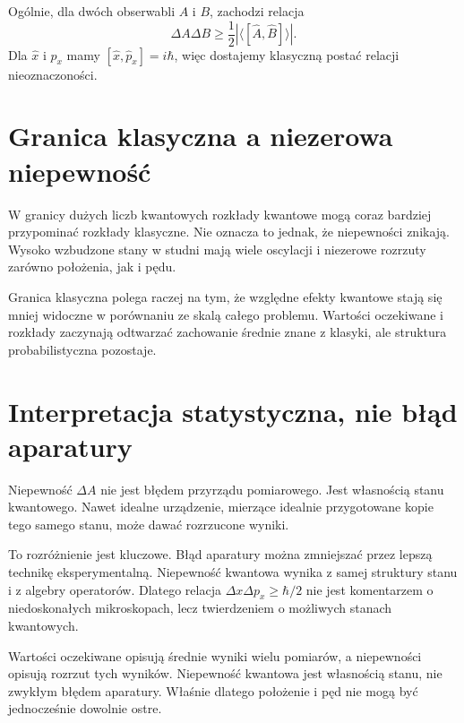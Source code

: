 Ogólnie, dla dwóch obserwabli \(A\) i \(B\), zachodzi relacja
\begin{equation}
    \Delta A\Delta B\geq \frac{1}{2}\left|\langle [\hat{A},\hat{B}]\rangle\right|.
\end{equation}
Dla \(\hat{x}\) i \(\hat{p}_x\) mamy \([\hat{x},\hat{p}_x]=i\hbar\), więc dostajemy klasyczną postać relacji nieoznaczoności.

\section{Granica klasyczna a niezerowa niepewność}

W granicy dużych liczb kwantowych rozkłady kwantowe mogą coraz bardziej przypominać rozkłady klasyczne. Nie oznacza to jednak, że niepewności znikają. Wysoko wzbudzone stany w studni mają wiele oscylacji i niezerowe rozrzuty zarówno położenia, jak i pędu.

Granica klasyczna polega raczej na tym, że względne efekty kwantowe stają się mniej widoczne w porównaniu ze skalą całego problemu. Wartości oczekiwane i rozkłady zaczynają odtwarzać zachowanie średnie znane z klasyki, ale struktura probabilistyczna pozostaje.

\section{Interpretacja statystyczna, nie błąd aparatury}

Niepewność \(\Delta A\) nie jest błędem przyrządu pomiarowego. Jest własnością stanu kwantowego. Nawet idealne urządzenie, mierzące idealnie przygotowane kopie tego samego stanu, może dawać rozrzucone wyniki.

To rozróżnienie jest kluczowe. Błąd aparatury można zmniejszać przez lepszą technikę eksperymentalną. Niepewność kwantowa wynika z samej struktury stanu i z algebry operatorów. Dlatego relacja \(\Delta x\Delta p_x\geq \hbar/2\) nie jest komentarzem o niedoskonałych mikroskopach, lecz twierdzeniem o możliwych stanach kwantowych.

\begin{summarybox}
Wartości oczekiwane opisują średnie wyniki wielu pomiarów, a niepewności opisują rozrzut tych wyników. Niepewność kwantowa jest własnością stanu, nie zwykłym błędem aparatury. Właśnie dlatego położenie i pęd nie mogą być jednocześnie dowolnie ostre.
\end{summarybox}
